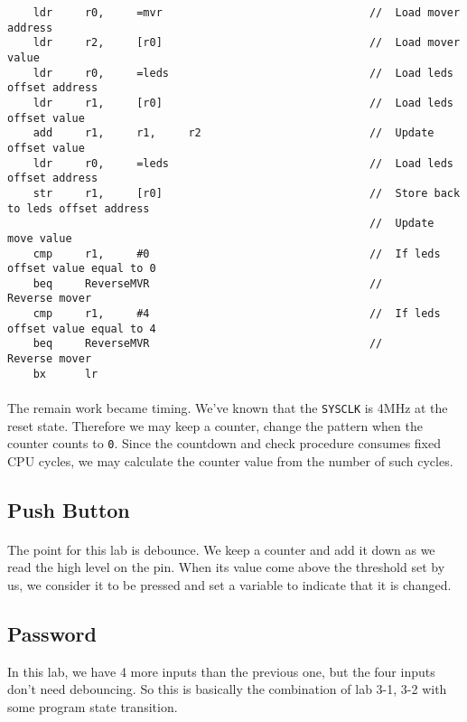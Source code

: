 \begin{lstlisting}
    ldr     r0,     =mvr                                //  Load mover address
    ldr     r2,     [r0]                                //  Load mover value
    ldr     r0,     =leds                               //  Load leds offset address
    ldr     r1,     [r0]                                //  Load leds offset value
    add     r1,     r1,     r2                          //  Update offset value
    ldr     r0,     =leds                               //  Load leds offset address
    str     r1,     [r0]                                //  Store back to leds offset address
                                                        //  Update move value
    cmp     r1,     #0                                  //  If leds offset value equal to 0
    beq     ReverseMVR                                  //      Reverse mover
    cmp     r1,     #4                                  //  If leds offset value equal to 4
    beq     ReverseMVR                                  //      Reverse mover
    bx      lr
\end{lstlisting}

\paragraph{}
The remain work became timing. We've known that the \texttt{SYSCLK} is 4MHz at the reset state.
Therefore we may keep a counter, change the pattern when the counter counts to \texttt{0}.
Since the countdown and check procedure consumes fixed CPU cycles, we may calculate the counter value from the number of such cycles.

\subsection{Push Button}
\paragraph{}
The point for this lab is debounce. We keep a counter and add it down as we read the high level on the pin.
When its value come above the threshold set by us, we consider it to be pressed and set a variable to indicate that it is changed.
\subsection{Password}
In this lab, we have 4 more inputs than the previous one, but the four inputs don't need debouncing.
So this is basically the combination of lab 3-1, 3-2 with some program state transition.

